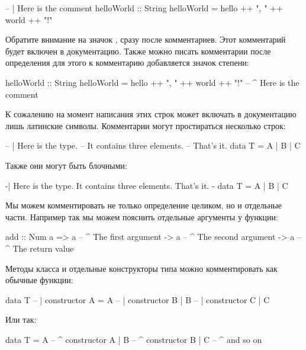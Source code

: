 \begin{code}
-- | Here is the comment
helloWorld :: String
helloWorld = hello ++ ", " ++ world ++ "!"
\end{code}

Обратите внимание на значок , сразу после
комментариев. Этот комментарий будет включен в документацию.
Также можно писать комментарии после определения для этого
к комментарию добавляется значок степени:

\begin{code}
helloWorld :: String
helloWorld = hello ++ ", " ++ world ++ "!"
-- ^ Here is the comment
\end{code}

К сожалению на момент написания этих строк 
может включать в документацию лишь латинские символы.
Комментарии могут простираться несколько строк:


\begin{code}
-- | Here is the type.
-- It contains three elements.
-- That's it.
data T = A | B | C
\end{code}

Также они могут быть блочными:

\begin{code}
{-|
   Here is the type.
   It contains three elements.
   That's it.
 -}
data T = A | B | C
\end{code}

Мы можем комментировать не только определение целиком,
но и отдельные части. Например так мы можем пояснить 
отдельные аргументы у функции:

\begin{code}
add :: Num a => a   -- ^ The first argument
             -> a   -- ^ The second argument   
             -> a   -- ^ The return value   
\end{code}

Методы класса и отдельные конструкторы типа можно комментировать
как обычные функции:

\begin{code}
data T
        -- | constructor A    
       = A      
        -- | constructor B
       | B      
        -- | constructor C
       | C     
\end{code}

Или так:

\begin{code}
data T = A      -- ^ constructor A
       | B      -- ^ constructor B
       | C      -- ^ and so on
\end{code}


